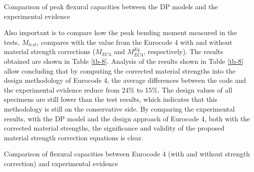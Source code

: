 \documentclass[12pt,a4]{article}
\begin{document}
	\par
	\begin{table}
		\caption{Comparison of peak flexural capacities between the DP models and the experimental evidence}
		\label{tb-7}
	\end{table}
	\par
	Also important is to compare how the peak bending moment measured in the tests, $M_{test}$, compares with the value from the Eurocode 4 with and without material strength corrections ($M_{EC4}$ and $M_{EC4}^{Eq}$, respectively). The results obtained are shown in Table \ref{tb-8}. Analysis of the results shown in Table \ref{tb-8} allow concluding that by computing the corrected material strengths into the design methodology of Eurocode 4, the average differences between the code and the experimental evidence reduce from 24\% to 15\%. The design values of all specimens are still lower than the test results, which indicates that this methodology is still on the conservative side. By comparing the experimental results, with the DP model and the design approach of Eurocode 4, both with the corrected material strengths, the significance and validity of the proposed material strength correction equations is clear.
	\par
	\begin{table}
		\caption{Comparison of flexural capacities between Eurocode 4 (with and without strength correction) and experimental evidence}
		\label{tb-8}
	\end{table}
	\par
\end{document}
